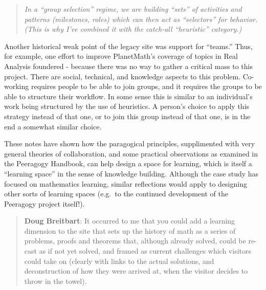 \begin{quote}
\emph{In a ``group selection'' regime, we are building ``sets'' of
activities and patterns (milestones, roles) which can then act as
``selectors'' for behavior. (This is why I've combined it with the
catch-all ``heuristic'' category.)}
\end{quote}
Another historical weak point of the legacy site was support for
``teams.'' Thus, for example, one effort to improve PlanetMath's
coverage of topics in Real Analysis foundered - because there was no way
to gather a critical mass to this project. There are social, technical,
and knowledge aspects to this problem. Co-working requires people to be
able to join groups, and it requires the groups to be able to structure
their workflow. In some sense this is similar to an individual's work
being structured by the use of heuristics. A person's choice to apply
this strategy instead of that one, or to join this group instead of that
one, is in the end a somewhat similar choice.

These notes have shown how the paragogical principles, supplimented with
very general theories of collaboration, and some practical observations
as examined in the Peeragogy Handbook, can help design a space for
learning, which is itself a ``learning space'' in the sense of knowledge
building. Although the case study has focused on mathematics learning,
similar reflections would apply to designing other sorts of learning
spaces (e.g.~to the continued development of the Peeragogy project
itself!).

\begin{quote}
\textbf{Doug Breitbart}: It occurred to me that you could add a learning
dimension to the site that sets up the history of math as a series of
problems, proofs and theorems that, although already solved, could be
re-cast as if not yet solved, and framed as current challenges which
visitors could take on (clearly with links to the actual solutions, and
deconstruction of how they were arrived at, when the visitor decides to
throw in the towel).
\end{quote}

